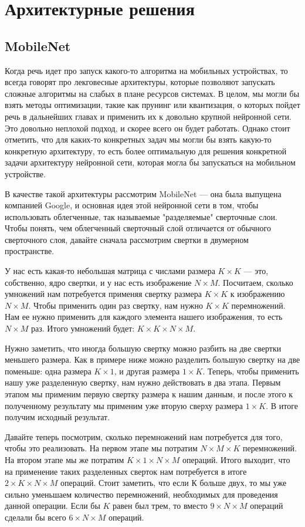 \documentclass[oneside,final,12pt]{extreport}
\begin{document}
\section{Архитектурные решения}
\subsection{MobileNet}
Когда речь идет про запуск какого-то алгоритма на мобильных устройствах, то всегда говорят про лекговесные архитектуры, которые позволяют запускать сложные алгоритмы на слабых в плане ресурсов системах. В целом, мы могли бы взять методы оптимизации, такие как прунинг или квантизация, о которых пойдет речь в дальнейших главах и применить их к довольно крупной нейронной сети. Это довольно неплохой подход, и скорее всего он будет работать. Однако стоит отметить, что для каких-то конкретных задач мы могли бы взять какую-то конкретную архитектуру, то есть более оптимальную для решения конкретной задачи архитектуру нейронной сети, которая могла бы запускаться на мобильном устройстве. 

В качестве такой архитектуры рассмотрим MobileNet — она была выпущена компанией Google, и основная идея этой нейронной сети в том, чтобы использовать облегченные, так называемые "разделяемые"  сверточные слои. Чтобы понять, чем облегченный сверточный слой отличается от обычного сверточного слоя, давайте сначала рассмотрим свертки в двумерном пространстве.

У нас есть какая-то небольшая матрица с числами размера $K \times K$ — это, собственно, ядро свертки, и у нас есть изображение $N \times M$. Посчитаем, сколько умножений нам потребуется применяя свертку размера $K \times K$ к изображению $N \times M$. Чтобы применить один раз свертку, нам нужно $K \times K$ перемножений. Нам ее нужно применить для каждого элемента нашего изображения, то есть $N \times M$ раз. Итого умножений будет: $K \times K \times N \times M$. 

Нужно заметить, что иногда большую свертку можно разбить на две свертки меньшего размера. Как в примере ниже можно разделить большую свертку на две поменьше: одна размера $K \times 1$, и другая размера $1 \times K$. Теперь, чтобы применить нашу уже разделенную свертку, нам нужно действовать в два этапа. Первым этапом мы применим первую свертку размера к нашим данным, и после этого к полученному результату мы применим уже вторую сверху размера $1 \times K$. В итоге получим исходный результат. 

Давайте теперь посмотрим, сколько перемножений нам потребуется для того, чтобы это реализовать. На первом этапе мы потратим $N \times M \times K$ перемножений. На втором этапе мы же потратим $K \times 1 \times N \times M$ операций. Итого выходит, что на применение таких разделенных сверток нам потребуется в итоге $2 \times  K \times N \times M$ операций. Стоит заметить, что если К больше двух, то мы уже сильно уменьшаем количество перемножений, необходимых для проведения данной операции. Если бы $K$ равен был трем, то вместо $9 \times N \times M$ операций сделали бы всего $6 \times N \times M$ операций. 
\end{document}
